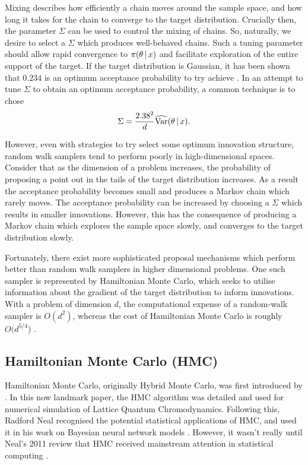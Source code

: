 Mixing describes how efficiently a chain moves around the sample space, and how
long it takes for the chain to converge to the target distribution.  Crucially
then, the parameter $\Sigma$ can be used to control the mixing of chains.  So,
naturally, we desire to select a $\Sigma$ which produces well-behaved chains.
Such a tuning parameter should allow rapid convergence to $\pi(\theta \,|\,
x)$ and facilitate exploration of the entire support of the target. If the
target distribution is Gaussian, it has been shown that $0.234$ is an optimum
acceptance probability to try achieve \parencite{roberts01}. In an attempt to
tune $\Sigma$ to obtain an optimum acceptance probability, a common technique
is to chose 
\begin{equation*}
  \Sigma = \frac{2.38^2}{d} \widehat{\text{Var}}(\theta \,|\, x).
\end{equation*}

However, even with strategies to try select some optimum innovation structure,
random walk samplers tend to perform poorly in high-dimensional spaces.
Consider that as the dimension of a problem increases, the probability of
proposing a point out in the tails of the target distribution increases. As a
result the acceptance probability becomes small and produces a Markov chain
which rarely moves. The acceptance probability can be increased by choosing a
$\Sigma$ which results in smaller innovations. However, this has the
consequence of producing a Markov chain which explores the sample space slowly,
and converges to the target distribution slowly.

Fortunately, there exist more sophisticated proposal mechanisms which perform
better than random walk samplers in higher dimensional problems. One such
sampler is represented by Hamiltonian Monte Carlo, which seeks to utilise
information about the gradient of the target distribution to inform
innovations. With a problem of dimension $d$, the computational expense of a
random-walk sampler is $O(d^2)$, whereas the cost of Hamiltonian Monte Carlo is
roughly $O(d^{5/4}$) \parencite{creutz88}. 

\subsection{Hamiltonian Monte Carlo (HMC)}

Hamiltonian Monte Carlo, originally Hybrid Monte Carlo, was first introduced by
\textcite{duane87}. In this now landmark paper, the HMC algorithm was detailed
and used for numerical simulation of Lattice Quantum Chromodynamics. Following
this, Radford Neal recognised the potential statistical applications of HMC,
and used it in his work on Bayesian neural network models \parencite{neal95}.
However, it wasn't really until Neal's 2011 review \parencite{neal11} that HMC
received mainstream attention in statistical computing
\parencite{betancourt18}.

